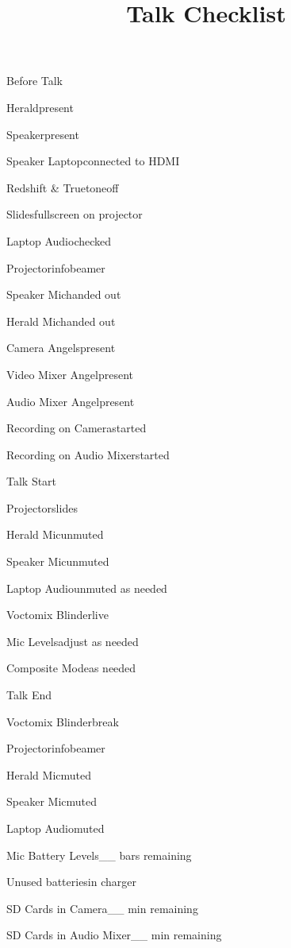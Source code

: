 \def\papersize{5}




\title{Talk Checklist}

\begin{checklist}{Before Talk}
  \item{Herald}{present}
  \item{Speaker}{present}
  \item{Speaker Laptop}{connected to HDMI}
  \item{Redshift \& Truetone}{off}
  \item{Slides}{fullscreen on projector}
  \item{Laptop Audio}{checked}
  \item{Projector}{infobeamer}
  \item{Speaker Mic}{handed out}
  \item{Herald Mic}{handed out}
  \item{Camera Angels}{present}
  \item{Video Mixer Angel}{present}
  \item{Audio Mixer Angel}{present}
  \item{Recording on Camera}{started}
  \item{Recording on Audio Mixer}{started}
\end{checklist}

\begin{checklist}{Talk Start}
  \item{Projector}{slides}
  \item{Herald Mic}{unmuted}
  \item{Speaker Mic}{unmuted}
  \item{Laptop Audio}{unmuted as needed}
  \item{Voctomix Blinder}{live}
  \item{Mic Levels}{adjust as needed}

  \item{Composite Mode}{as needed}
\end{checklist}

\begin{checklist}{Talk End}
  \item{Voctomix Blinder}{break}
  \item{Projector}{infobeamer}
  \item{Herald Mic}{muted}
  \item{Speaker Mic}{muted}
  \item{Laptop Audio}{muted}
  \item{Mic Battery Levels}{\_\_ bars remaining}
  \item{Unused batteries}{in charger}
  \item{SD Cards in Camera}{\_\_ min remaining}
  \item{SD Cards in Audio Mixer}{\_\_ min remaining}
\end{checklist}


